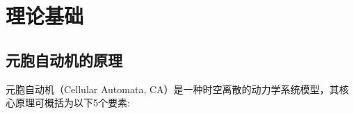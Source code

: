 \documentclass[forprint]{WHUBachelor}
\begin{document}









\chapter{理论基础}

\section{元胞自动机的原理}
元胞自动机（Cellular Automata, CA）是一种时空离散的动力学系统模型，其核心原理可概括为以下5个要素:
\end{document}
